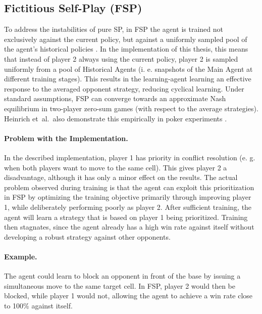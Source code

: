 \documentclass[10pt,twocolumn,letterpaper]{article}
\begin{document}
\subsection{Fictitious Self-Play (FSP)}
To address the instabilities of pure SP, in FSP the agent is trained not exclusively against the current policy, but against a uniformly sampled pool of the agent’s historical policies \cite{vinyals2019alphastar}.
In the implementation of this thesis, this means that instead of player 2 always using the current policy, player 2 is sampled uniformly from a pool of Historical Agents (i. e. snapshots of the Main Agent at different training stages).
This results in the learning-agent learning an effective response to the averaged opponent strategy, reducing cyclical learning.
Under standard assumptions, FSP can converge towards an approximate Nash equilibrium in two-player zero-sum games (with respect to the average strategies).
Heinrich et~al.\ also demonstrate this empirically in poker experiments \cite{heinrich2015fsp}.

\paragraph{Problem with the Implementation.} 
In the described implementation, player 1 has priority in conflict resolution (e. g. when both players want to move to the same cell).
This gives player 2 a disadvantage, although it has only a minor effect on the results. 
The actual problem observed during training is that the agent can exploit this prioritization in FSP by optimizing the training objective primarily through improving player 1, while deliberately performing poorly as player 2.
After sufficient training, the agent will learn a strategy that is based on player 1 being prioritized.
Training then stagnates, since the agent already has a high win rate against itself without developing a robust strategy against other opponents.

\paragraph{Example.} 
The agent could learn to block an opponent in front of the base by issuing a simultaneous move to the same target cell.
In FSP, player 2 would then be blocked, while player 1 would not, allowing the agent to achieve a win rate close to 100\% against itself.
\end{document}

